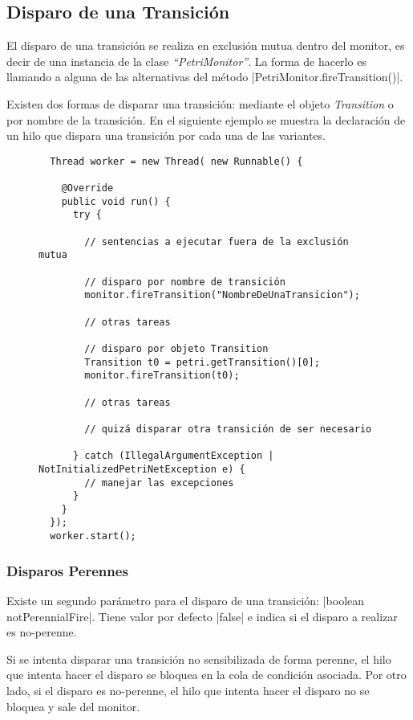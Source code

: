 \subsection{Disparo de una Transición}

El disparo de una transición se realiza en exclusión mutua dentro del monitor,
es decir de una instancia de la clase \textit{``PetriMonitor''}. La forma de
hacerlo es llamando a alguna de las alternativas del método
|PetriMonitor.fireTransition()|.

Existen dos formas de disparar una transición: mediante el objeto
\textit{Transition} o por nombre de la transición.
En el siguiente ejemplo se muestra la declaración de un hilo que dispara una
transición por cada una de las variantes.

\begin{figure}[H]
\centering
\begin{verbatim}
  Thread worker = new Thread( new Runnable() {
  
    @Override
    public void run() {
      try {
      
        // sentencias a ejecutar fuera de la exclusión mutua

        // disparo por nombre de transición
        monitor.fireTransition("NombreDeUnaTransicion");

        // otras tareas

        // disparo por objeto Transition
        Transition t0 = petri.getTransition()[0];
        monitor.fireTransition(t0);
      
        // otras tareas
      
        // quizá disparar otra transición de ser necesario

      } catch (IllegalArgumentException | NotInitializedPetriNetException e) {
        // manejar las excepciones
      }
    }
  });
  worker.start();
\end{verbatim}
\end{figure}

\subsubsection*{Disparos Perennes}
\label{disparos_perennes}
Existe un segundo parámetro para el disparo de una transición: 
|boolean notPerennialFire|. Tiene valor por defecto
|false| e indica si el disparo a realizar es no-perenne.

Si se intenta disparar una transición no sensibilizada de forma perenne, el hilo
que intenta hacer el disparo se bloquea en la cola de condición asociada. Por
otro lado, si el disparo es no-perenne, el hilo que intenta hacer el disparo no
se bloquea y sale del monitor.

